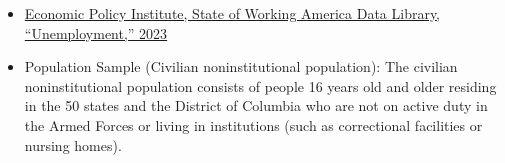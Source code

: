 \documentclass[
]{article}
\providecommand{\tightlist}{%
  \setlength{\itemsep}{0pt}\setlength{\parskip}{0pt}}
\begin{document}
\begin{itemize}
\tightlist
\item
  \href{https://www.epi.org/data/}{Economic Policy Institute, State of
  Working America Data Library, ``Unemployment,'' 2023}
\item
  Population Sample (Civilian noninstitutional population): The civilian
  noninstitutional population consists of people 16 years old and older
  residing in the 50 states and the District of Columbia who are not on
  active duty in the Armed Forces or living in institutions (such as
  correctional facilities or nursing homes).
\end{itemize}
\end{document}
